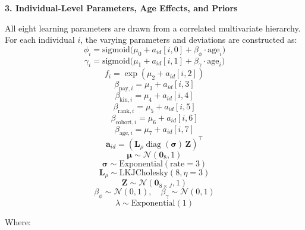 \documentclass[
  letterpaper,
  DIV=11,
  numbers=noendperiod]{scrartcl}
\begin{document}
\textbf{3. Individual-Level Parameters, Age Effects, and Priors}

All eight learning parameters are drawn from a correlated multivariate
hierarchy. For each individual \(i\), the varying parameters and
deviations are constructed as: \[
\phi_i = \text{sigmoid}\bigl(\mu_0 + a_{id}[i, 0] + \beta_{\phi} \cdot \text{age}_i\bigr)
\] \[
\gamma_i = \text{sigmoid}\bigl(\mu_1 + a_{id}[i, 1] + \beta_{\gamma} \cdot \text{age}_i\bigr)
\] \[
f_i = \exp(\mu_2 + a_{id}[i, 2])
\] \[
\beta_{\text{pay},i} = \mu_3 + a_{id}[i, 3]
\] \[
\beta_{\text{kin},i} = \mu_4 + a_{id}[i, 4]
\] \[
\beta_{\text{rank},i} = \mu_5 + a_{id}[i, 5]
\] \[
\beta_{\text{cohort},i} = \mu_6 + a_{id}[i, 6]
\] \[
\beta_{\text{age},i} = \mu_7 + a_{id}[i, 7]
\] \[
\mathbf{a}_{id} = (\mathbf{L}_{\rho} \operatorname{diag}(\boldsymbol{\sigma}) \, \mathbf{Z})^\top
\] \[
\boldsymbol{\mu} \sim \mathcal{N}(\mathbf{0}_8, 1)
\] \[
\boldsymbol{\sigma} \sim \text{Exponential}(\text{rate}=3)
\] \[
\mathbf{L}_{\rho} \sim \text{LKJCholesky}(8, \eta=3)
\] \[
\mathbf{Z} \sim \mathcal{N}(\mathbf{0}_{8 \times J}, 1)
\] \[
\beta_{\phi} \sim \mathcal{N}(0, 1), \quad \beta_{\gamma} \sim \mathcal{N}(0, 1)
\] \[
\lambda \sim \text{Exponential}(1)
\]

Where:
\end{document}
